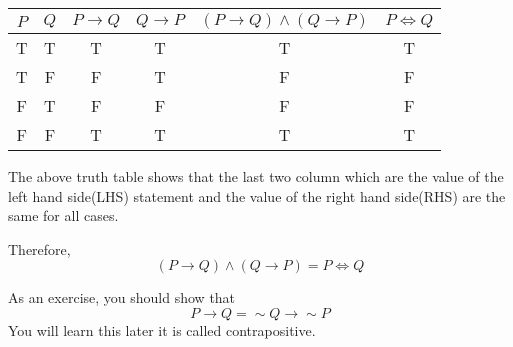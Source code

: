 \documentclass[a4paper, 12pt]{article}
\theoremstyle{examplestyle}
\begin{document}
\begin{table*}[h]
\begin{center}
		\begin{tabular}{c|c||c|c||c||c}
		\hline\hline $P$ & $Q$ & $P \to Q$ & $Q \to P$ & $(P \to Q) \land (Q \to P)$ & $P \iff Q$  \\ 
		\hline        T  &  T  &      T    &     T     &              T              &     T\\ 
		\hline        T  &  F  &      F    &     T     &              F              &     F\\
		\hline        F  &  T  &      F    &     F     &              F              &     F\\ 
		\hline        F  &  F  &      T    &     T     &              T              &     T\\ 
		\hline\hline 
	\end{tabular} 
\end{center}
\end{table*}
\begin{multicols}{2}
 The above truth table shows that the last two column which are the value of the left hand side(LHS) statement and the value of the right hand side(RHS) are the same for all cases.
 
 Therefore,
 \[
 (P \to Q) \land (Q \to P) = P \iff Q
 \]
 
 As an exercise, you should show that
 \[
	 P \to Q = \sim Q \to \sim P
 \]
 You will learn this later it is called contrapositive.
\end{multicols}
\end{document}
